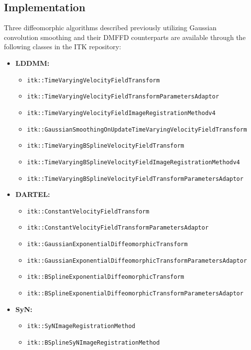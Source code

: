 \documentclass{frontiersSCNS}
\begin{document}
\subsection{Implementation}

Three diffeomorphic algorithms described previously utilizing Gaussian convolution smoothing and their DMFFD counterparts are available through the following classes in the ITK repository: 
\begin{itemize}
  \item {\bf LDDMM:}
    \begin{itemize}
      \item {\tt itk::TimeVaryingVelocityFieldTransform} 
      \item {\tt itk::TimeVaryingVelocityFieldTransformParametersAdaptor}
      \item {\tt itk::TimeVaryingVelocityFieldImageRegistrationMethodv4}
      \item {\tt itk::GaussianSmoothingOnUpdateTimeVaryingVelocityFieldTransform}
      \item {\tt itk::TimeVaryingBSplineVelocityFieldTransform} 
      \item {\tt itk::TimeVaryingBSplineVelocityFieldImageRegistrationMethodv4}
      \item {\tt itk::TimeVaryingBSplineVelocityFieldTransformParametersAdaptor}
    \end{itemize}  
  \item {\bf DARTEL:}
    \begin{itemize}
       \item{\tt itk::ConstantVelocityFieldTransform}
       \item{\tt itk::ConstantVelocityFieldTransformParametersAdaptor}
      \item {\tt itk::GaussianExponentialDiffeomorphicTransform} 
      \item {\tt itk::GaussianExponentialDiffeomorphicTransformParametersAdaptor}
      \item {\tt itk::BSplineExponentialDiffeomorphicTransform} 
      \item {\tt itk::BSplineExponentialDiffeomorphicTransformParametersAdaptor}
    \end{itemize}  
  \item {\bf SyN:}
    \begin{itemize}
      \item {\tt itk::SyNImageRegistrationMethod} 
      \item {\tt itk::BSplineSyNImageRegistrationMethod} 
    \end{itemize}  
\end{itemize}
\end{document}

